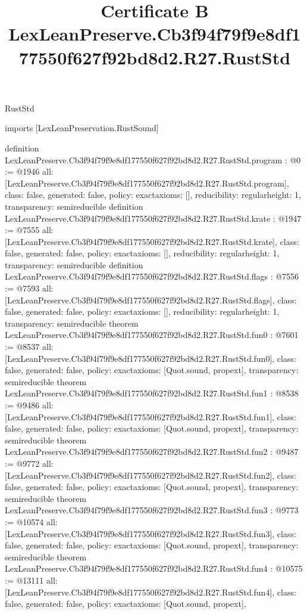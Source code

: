 \begin{lexlean}{RustStd}
\title{Certificate B LexLeanPreserve.Cb3f94f79f9e8df177550f627f92bd8d2.R27.RustStd}
\begin{coremodule}
imports [LexLeanPreservation.RustSound]

definition LexLeanPreserve.Cb3f94f79f9e8df177550f627f92bd8d2.R27.RustStd.program : @0 := @1946 {
  all: [LexLeanPreserve.Cb3f94f79f9e8df177550f627f92bd8d2.R27.RustStd.program],
  class: false,
  generated: false,
  policy: exact{axioms: []},
  reducibility: regular{height: 1},
  transparency: semireducible
}
definition LexLeanPreserve.Cb3f94f79f9e8df177550f627f92bd8d2.R27.RustStd.krate : @1947 := @7555 {
  all: [LexLeanPreserve.Cb3f94f79f9e8df177550f627f92bd8d2.R27.RustStd.krate],
  class: false,
  generated: false,
  policy: exact{axioms: []},
  reducibility: regular{height: 1},
  transparency: semireducible
}
definition LexLeanPreserve.Cb3f94f79f9e8df177550f627f92bd8d2.R27.RustStd.flags : @7556 := @7593 {
  all: [LexLeanPreserve.Cb3f94f79f9e8df177550f627f92bd8d2.R27.RustStd.flags],
  class: false,
  generated: false,
  policy: exact{axioms: []},
  reducibility: regular{height: 1},
  transparency: semireducible
}
theorem LexLeanPreserve.Cb3f94f79f9e8df177550f627f92bd8d2.R27.RustStd.fun0 : @7601 := @8537 {
  all: [LexLeanPreserve.Cb3f94f79f9e8df177550f627f92bd8d2.R27.RustStd.fun0],
  class: false,
  generated: false,
  policy: exact{axioms: [Quot.sound, propext]},
  transparency: semireducible
}
theorem LexLeanPreserve.Cb3f94f79f9e8df177550f627f92bd8d2.R27.RustStd.fun1 : @8538 := @9486 {
  all: [LexLeanPreserve.Cb3f94f79f9e8df177550f627f92bd8d2.R27.RustStd.fun1],
  class: false,
  generated: false,
  policy: exact{axioms: [Quot.sound, propext]},
  transparency: semireducible
}
theorem LexLeanPreserve.Cb3f94f79f9e8df177550f627f92bd8d2.R27.RustStd.fun2 : @9487 := @9772 {
  all: [LexLeanPreserve.Cb3f94f79f9e8df177550f627f92bd8d2.R27.RustStd.fun2],
  class: false,
  generated: false,
  policy: exact{axioms: [Quot.sound, propext]},
  transparency: semireducible
}
theorem LexLeanPreserve.Cb3f94f79f9e8df177550f627f92bd8d2.R27.RustStd.fun3 : @9773 := @10574 {
  all: [LexLeanPreserve.Cb3f94f79f9e8df177550f627f92bd8d2.R27.RustStd.fun3],
  class: false,
  generated: false,
  policy: exact{axioms: [Quot.sound, propext]},
  transparency: semireducible
}
theorem LexLeanPreserve.Cb3f94f79f9e8df177550f627f92bd8d2.R27.RustStd.fun4 : @10575 := @13111 {
  all: [LexLeanPreserve.Cb3f94f79f9e8df177550f627f92bd8d2.R27.RustStd.fun4],
  class: false,
  generated: false,
  policy: exact{axioms: [Quot.sound, propext]},
}
\end{coremodule}
\end{lexlean}
